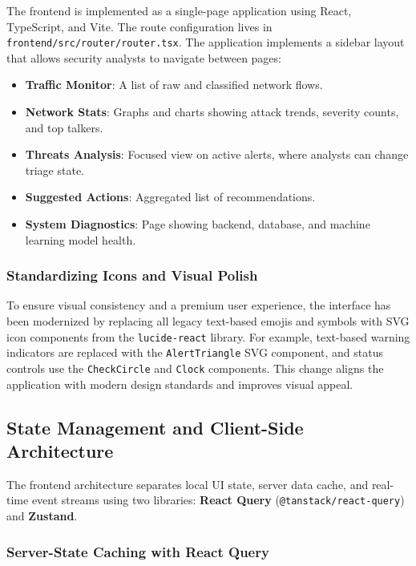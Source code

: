 \documentclass[12pt,a4paper]{report}
\begin{document}
The frontend is implemented as a single-page application using React, TypeScript, and Vite. The route configuration lives in \texttt{frontend/src/router/router.tsx}. The application implements a sidebar layout that allows security analysts to navigate between pages:
\begin{itemize}[leftmargin=1.5em]
  \item \textbf{Traffic Monitor}: A list of raw and classified network flows.
  \item \textbf{Network Stats}: Graphs and charts showing attack trends, severity counts, and top talkers.
  \item \textbf{Threats Analysis}: Focused view on active alerts, where analysts can change triage state.
  \item \textbf{Suggested Actions}: Aggregated list of recommendations.
  \item \textbf{System Diagnostics}: Page showing backend, database, and machine learning model health.
\end{itemize}

\subsubsection{Standardizing Icons and Visual Polish}

To ensure visual consistency and a premium user experience, the interface has been modernized by replacing all legacy text-based emojis and symbols with SVG icon components from the \texttt{lucide-react} library. For example, text-based warning indicators are replaced with the \texttt{AlertTriangle} SVG component, and status controls use the \texttt{CheckCircle} and \texttt{Clock} components. This change aligns the application with modern design standards and improves visual appeal.

\subsection{State Management and Client-Side Architecture}

The frontend architecture separates local UI state, server data cache, and real-time event streams using two libraries: \textbf{React Query} (\texttt{@tanstack/react-query}) and \textbf{Zustand}.

\subsubsection{Server-State Caching with React Query}
\end{document}
